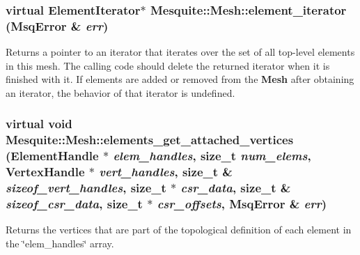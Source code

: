 \documentclass[letter]{report}
\begin{document}
\subsubsection{\setlength{\rightskip}{0pt plus 5cm}virtual Element\-Iterator$\ast$ Mesquite::Mesh::element\_\-iterator ({\bf Msq\-Error} \& {\em err})\hspace{0.3cm}{\tt  [pure virtual]}}\label{classMesquite_1_1Mesh_a6}


Returns a pointer to an iterator that iterates over the set of all top-level elements in this mesh. The calling code should delete the returned iterator when it is finished with it. If elements are added or removed from the {\bf Mesh} after obtaining an iterator, the behavior of that iterator is undefined. 

\subsubsection{\setlength{\rightskip}{0pt plus 5cm}virtual void Mesquite::Mesh::elements\_\-get\_\-attached\_\-vertices (Element\-Handle $\ast$ {\em elem\_\-handles}, size\_\-t {\em num\_\-elems}, Vertex\-Handle $\ast$ {\em vert\_\-handles}, size\_\-t \& {\em sizeof\_\-vert\_\-handles}, size\_\-t $\ast$ {\em csr\_\-data}, size\_\-t \& {\em sizeof\_\-csr\_\-data}, size\_\-t $\ast$ {\em csr\_\-offsets}, {\bf Msq\-Error} \& {\em err})\hspace{0.3cm}{\tt  [pure virtual]}}\label{classMesquite_1_1Mesh_a18}


Returns the vertices that are part of the topological definition of each element in the \char`\"{}elem\_\-handles\char`\"{} array.
\end{document}

